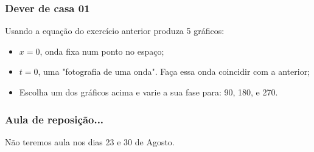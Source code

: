 \begin{frame}
\frametitle{Dever de casa 01}
    \begin{block}{}
        Usando a equação do exercício anterior produza 5 gráficos:
        \begin{itemize}
            \item $x = 0$, onda fixa num ponto no espaço;
            \item $t = 0$, uma "fotografia de uma onda".  Faça essa onda
                  coincidir com a anterior;
            \item Escolha um dos gráficos acima e varie a sua fase para:
                  90\textdegree{}, 180\textdegree{}, e 270\textdegree{}.
        \end{itemize}
    \end{block}
\end{frame}

\begin{frame}
\frametitle{Aula de reposição...}
    \begin{block}{}
        Não teremos aula nos dias 23 e 30 de Agosto.
    \end{block}
\end{frame}


